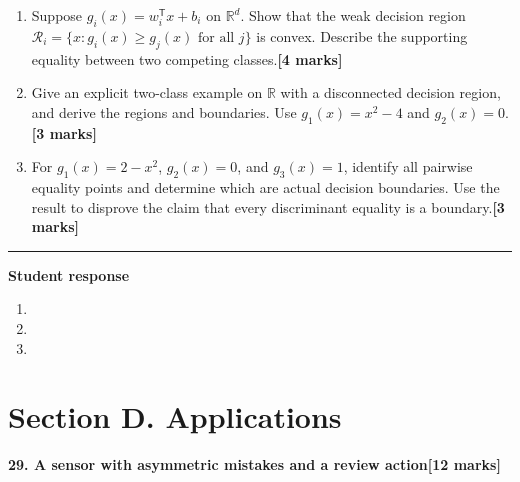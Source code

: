 \documentclass[11pt,a4paper]{article}
\newlength{\BlankAnswerHeight}\setlength{\BlankAnswerHeight}{16mm}
\newcommand{\AnswerBlank}{\leavevmode\par\vspace{\BlankAnswerHeight}}
\begin{document}
\begin{enumerate}[label=(\alph*),leftmargin=8mm,itemsep=3pt]
\item Suppose \(g_i(x)=w_i^\mathsf Tx+b_i\) on \(\mathbb R^d\). Show that the weak decision region \(\mathcal R_i=\{x:g_i(x)\ge g_j(x)\text{ for all }j\}\) is convex. Describe the supporting equality between two competing classes.\hfill\textbf{[4 marks]}
\item Give an explicit two-class example on \(\mathbb R\) with a disconnected decision region, and derive the regions and boundaries. Use \(g_1(x)=x^2-4\) and \(g_2(x)=0\).\hfill\textbf{[3 marks]}
\item For \(g_1(x)=2-x^2\), \(g_2(x)=0\), and \(g_3(x)=1\), identify all pairwise equality points and determine which are actual decision boundaries. Use the result to disprove the claim that every discriminant equality is a boundary.\hfill\textbf{[3 marks]}
\end{enumerate}\par\medskip\hrule\medskip\textbf{Student response}\par
\begin{enumerate}[label=(\alph*),leftmargin=8mm,itemsep=3pt]
\item
\AnswerBlank
\item
\AnswerBlank
\item
\AnswerBlank
\end{enumerate}
\newpage\section*{Section D. Applications}
\textbf{29. A sensor with asymmetric mistakes and a review action}\hfill\textbf{[12 marks]}\par\medskip
\end{document}
